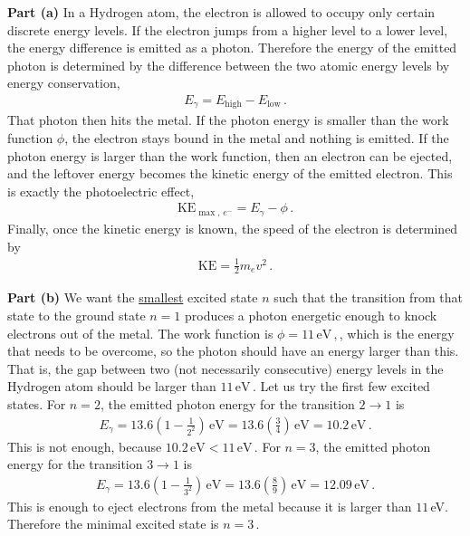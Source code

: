 \documentclass[11pt]{article}
\begin{document}
\noindent\textbf{Part (a)} In a Hydrogen atom, the electron is allowed to occupy only certain discrete energy levels. If the electron jumps from a higher level to a lower level, the energy difference is emitted as a photon. Therefore the energy of the emitted photon is determined by the difference between the two atomic energy levels by energy conservation, 
\begin{align*}
E_{\gamma} = E_{\text{high}} - E_{\text{low}}\,.
\end{align*}
That photon then hits the metal. If the photon energy is smaller than the work function $\phi$, the electron stays bound in the metal and nothing is emitted. If the photon energy is larger than the work function, then an electron can be ejected, and the leftover energy becomes the kinetic energy of the emitted electron. This is exactly the photoelectric effect,
\begin{align*}
\text{KE}_{\max,\,e^-} = E_{\gamma} - \phi\,.
\end{align*}
Finally, once the kinetic energy is known, the speed of the electron is determined by
\begin{align*}
\text{KE} = \frac{1}{2}m_ev^2\,.
\end{align*}

\noindent\textbf{Part (b)} We want the \underline{smallest} excited state $n$ such that the transition from that state to the ground state $n=1$ produces a photon energetic enough to knock electrons out of the metal. The work function is
$
\phi = 11\,\text{eV}\,,
$, which is the energy that needs to be overcome, so the photon should have an energy larger than this. That is, the gap between two (not necessarily consecutive) energy levels in the Hydrogen atom should be larger than $11\,\text{eV}\,.$ Let us try the first few excited states. For $n=2$, the emitted photon energy for the transition $2\to 1$ is
\begin{align*}
E_{\gamma} = 13.6\left(1-\frac{1}{2^2}\right)\,\text{eV}
= 13.6\left(\frac{3}{4}\right)\,\text{eV}
= 10.2\,\text{eV}\,.
\end{align*}
This is not enough, because
$10.2\,\text{eV} < 11\,\text{eV}\,.$ For $n=3$, the emitted photon energy for the transition $3\to 1$ is
\begin{align*}
E_{\gamma} = 13.6\left(1-\frac{1}{3^2}\right)\,\text{eV}
= 13.6\left(\frac{8}{9}\right)\,\text{eV}
= 12.09\,\text{eV}\,.
\end{align*}
This is enough to eject electrons from the metal because it is larger than $11\,$eV. Therefore the minimal excited state is
$n=3\,.$\\
\end{document}
